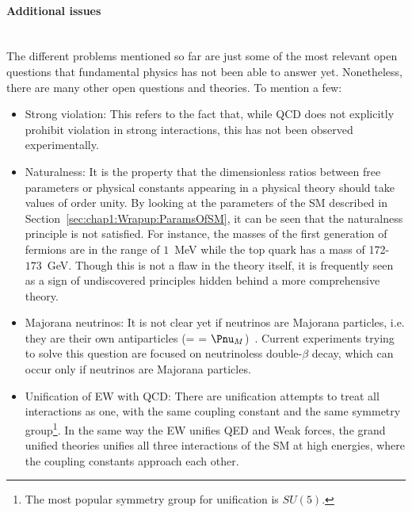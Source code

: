 \paragraph{Additional issues}\mbox{}\\ %
The different problems mentioned so far are just some of the most relevant open questions that fundamental 
physics has not been able to answer yet. %
Nonetheless, there are many other open questions and theories. To mention a few:
\begin{itemize}
	\item Strong \CP violation: This refers to the fact that, while QCD does not explicitly prohibit \CP 
		violation in strong interactions, this has not been observed experimentally.
	\item Naturalness:  It is the property that the dimensionless ratios between free parameters or physical constants 
		appearing in a physical theory should take values of order unity.  By looking at the parameters of the SM 
		described in Section~\ref{sec:chap1:Wrapup:ParamsOfSM}, it can be seen that the naturalness principle
		is not satisfied. For instance, the masses of the first generation of fermions are in the range of $1$~MeV 
		while the top quark has a mass of 172-$173$~GeV.
		Though this is not a flaw in the theory itself, it is frequently seen as a sign of undiscovered principles hidden 
		behind a more comprehensive theory.
	\item Majorana neutrinos: It is not clear yet if neutrinos are Majorana particles, i.e. they are their own 
		antiparticles (\Pnu = \APnu = $\Pnu_{M}$)~\cite{Majorana:1937vz}.
		Current experiments trying to solve this question are focused on neutrinoless double-$\beta$ decay,
		which can occur only if neutrinos are Majorana particles. 
	\item Unification of EW with QCD: There are unification attempts to treat all interactions as one, with the same coupling constant 
	and the same symmetry group\footnote{The most popular symmetry group for unification is $SU(5)$.}.
	In the same way the EW unifies QED and Weak forces, the grand unified theories unifies 
	all three interactions of the SM at high energies, where the coupling constants 
	approach each other. 
	

\end{itemize}

